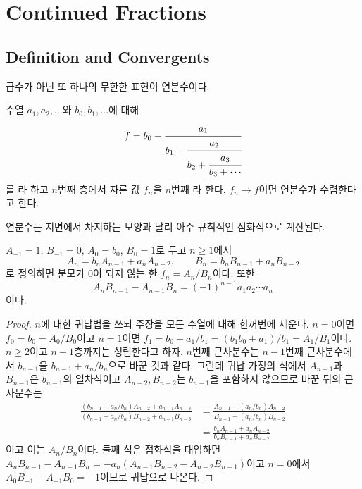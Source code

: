 \section{Continued Fractions}
\label{sec:continued-fractions}

\subsection{Definition and Convergents}

급수가 아닌 또 하나의 무한한 표현이 연분수이다.

\begin{definition}[연분수]
\label{def:cf}
수열 $a_1,a_2,\dots$와 $b_0,b_1,\dots$에 대해
\[
f=b_0+\cfrac{a_1}{b_1+\cfrac{a_2}{b_2+\cfrac{a_3}{b_3+\cdots}}}
\]
를 라 하고 $n$번째 층에서 자른 값 $f_n$을 $n$번째 라 한다. $f_n\to f$이면 연분수가 수렴한다고 한다.
\end{definition}

연분수는 지면에서 차지하는 모양과 달리 아주 규칙적인 점화식으로 계산된다.

\begin{theorem}
\label{thm:cf-recurrence}
$A_{-1}=1$, $B_{-1}=0$, $A_0=b_0$, $B_0=1$로 두고 $n\ge1$에서
\[
A_n=b_nA_{n-1}+a_nA_{n-2},\qquad B_n=b_nB_{n-1}+a_nB_{n-2}
\]
로 정의하면 분모가 $0$이 되지 않는 한 $f_n=A_n/B_n$이다. 또한
\[
A_nB_{n-1}-A_{n-1}B_n=(-1)^{n-1}a_1a_2\cdots a_n
\]
이다.
\end{theorem}

\begin{proof}
$n$에 대한 귀납법을 쓰되 주장을 모든 수열에 대해 한꺼번에 세운다. $n=0$이면 $f_0=b_0=A_0/B_0$이고 $n=1$이면 $f_1=b_0+a_1/b_1=(b_1b_0+a_1)/b_1=A_1/B_1$이다. $n\ge2$이고 $n-1$층까지는 성립한다고 하자. $n$번째 근사분수는 $n-1$번째 근사분수에서 $b_{n-1}$을 $b_{n-1}+a_n/b_n$으로 바꾼 것과 같다. 그런데 귀납 가정의 식에서 $A_{n-1}$과 $B_{n-1}$은 $b_{n-1}$의 일차식이고 $A_{n-2},B_{n-2}$는 $b_{n-1}$을 포함하지 않으므로 바꾼 뒤의 근사분수는
\begin{align*}
\frac{(b_{n-1}+a_n/b_n)A_{n-2}+a_{n-1}A_{n-3}}{(b_{n-1}+a_n/b_n)B_{n-2}+a_{n-1}B_{n-3}}
&=\frac{A_{n-1}+(a_n/b_n)A_{n-2}}{B_{n-1}+(a_n/b_n)B_{n-2}}\\
&=\frac{b_nA_{n-1}+a_nA_{n-2}}{b_nB_{n-1}+a_nB_{n-2}}
\end{align*}
이고 이는 $A_n/B_n$이다. 둘째 식은 점화식을 대입하면 $A_nB_{n-1}-A_{n-1}B_n=-a_n(A_{n-1}B_{n-2}-A_{n-2}B_{n-1})$이고 $n=0$에서 $A_0B_{-1}-A_{-1}B_0=-1$이므로 귀납으로 나온다.
\end{proof}

